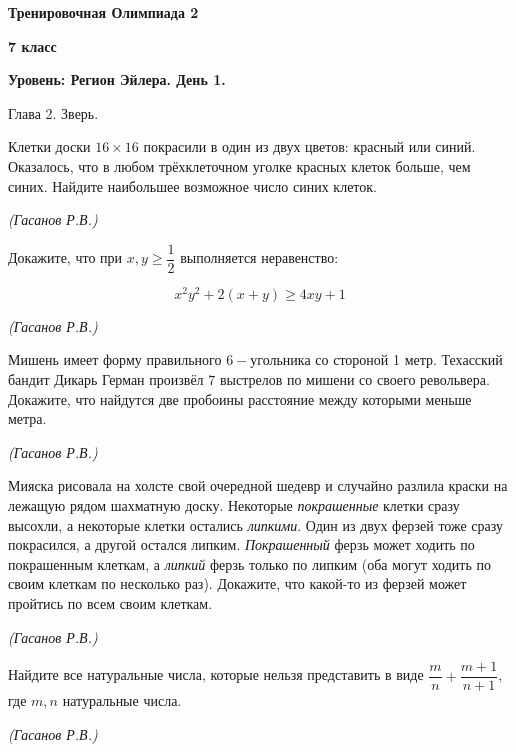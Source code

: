\centerline{\Huge \bf  Тренировочная Олимпиада 2}
\centerline{\Huge \bf 7 класс}
\centerline{\Huge \bf Уровень: Регион Эйлера. День 1.}

\begin{flushright}
    \scriptsize{Глава 2. Зверь.}
\end{flushright}


Клетки доски $16\times 16$ покрасили в один из двух цветов: красный или синий. Оказалось, что в любом трёхклеточном уголке красных клеток больше, чем синих. Найдите наибольшее возможное число синих клеток.
\begin{flushright}
    \textit{\small{(Гасанов Р.В.)}}
\end{flushright}

 Докажите, что при $x, y \geq \dfrac{1}{2}$ выполняется неравенство:
 
\[ x^2y^2 + 2(x+y) \geq 4xy + 1 \]
\begin{flushright}
    \textit{\small{(Гасанов Р.В.)}}
\end{flushright}

Мишень имеет форму правильного $6-$угольника со стороной 1 метр. Техасский бандит Дикарь Герман произвёл $7$ выстрелов по мишени со своего револьвера. Докажите, что  найдутся две пробоины расстояние между которыми меньше метра.
\begin{flushright}
    \textit{\small{(Гасанов Р.В.)}}
\end{flushright}

Мияска рисовала на холсте свой очередной шедевр и случайно разлила краски на лежащую рядом шахматную доску. Некоторые \textit{покрашенные} клетки сразу высохли, а некоторые клетки остались \textit{липкими}. Один из двух ферзей тоже сразу покрасился, а другой остался липким. \textit{Покрашенный} ферзь может ходить по покрашенным клеткам, а \textit{липкий} ферзь только по липким (оба могут ходить по своим клеткам по несколько раз). Докажите, что какой-то из ферзей может пройтись по всем своим клеткам.
\begin{flushright}
    \textit{\small{(Гасанов Р.В.)}}
\end{flushright}

Найдите все натуральные числа, которые нельзя представить в виде $\dfrac{m}{n} + \dfrac{m+1}{n+1}$, где $m, n$ натуральные числа.

\begin{flushright}
    \textit{\small{(Гасанов Р.В.)}}
\end{flushright}